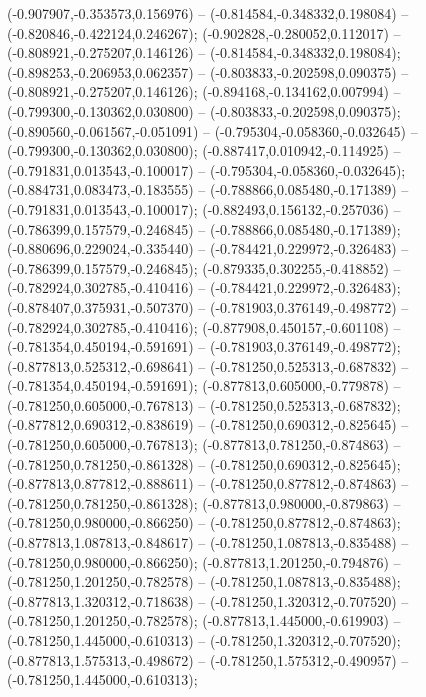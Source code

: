  (-0.907907,-0.353573,0.156976) -- (-0.814584,-0.348332,0.198084) -- (-0.820846,-0.422124,0.246267);
 (-0.902828,-0.280052,0.112017) -- (-0.808921,-0.275207,0.146126) -- (-0.814584,-0.348332,0.198084);
 (-0.898253,-0.206953,0.062357) -- (-0.803833,-0.202598,0.090375) -- (-0.808921,-0.275207,0.146126);
 (-0.894168,-0.134162,0.007994) -- (-0.799300,-0.130362,0.030800) -- (-0.803833,-0.202598,0.090375);
 (-0.890560,-0.061567,-0.051091) -- (-0.795304,-0.058360,-0.032645) -- (-0.799300,-0.130362,0.030800);
 (-0.887417,0.010942,-0.114925) -- (-0.791831,0.013543,-0.100017) -- (-0.795304,-0.058360,-0.032645);
 (-0.884731,0.083473,-0.183555) -- (-0.788866,0.085480,-0.171389) -- (-0.791831,0.013543,-0.100017);
 (-0.882493,0.156132,-0.257036) -- (-0.786399,0.157579,-0.246845) -- (-0.788866,0.085480,-0.171389);
 (-0.880696,0.229024,-0.335440) -- (-0.784421,0.229972,-0.326483) -- (-0.786399,0.157579,-0.246845);
 (-0.879335,0.302255,-0.418852) -- (-0.782924,0.302785,-0.410416) -- (-0.784421,0.229972,-0.326483);
 (-0.878407,0.375931,-0.507370) -- (-0.781903,0.376149,-0.498772) -- (-0.782924,0.302785,-0.410416);
 (-0.877908,0.450157,-0.601108) -- (-0.781354,0.450194,-0.591691) -- (-0.781903,0.376149,-0.498772);
 (-0.877813,0.525312,-0.698641) -- (-0.781250,0.525313,-0.687832) -- (-0.781354,0.450194,-0.591691);
 (-0.877813,0.605000,-0.779878) -- (-0.781250,0.605000,-0.767813) -- (-0.781250,0.525313,-0.687832);
 (-0.877812,0.690312,-0.838619) -- (-0.781250,0.690312,-0.825645) -- (-0.781250,0.605000,-0.767813);
 (-0.877813,0.781250,-0.874863) -- (-0.781250,0.781250,-0.861328) -- (-0.781250,0.690312,-0.825645);
 (-0.877813,0.877812,-0.888611) -- (-0.781250,0.877812,-0.874863) -- (-0.781250,0.781250,-0.861328);
 (-0.877813,0.980000,-0.879863) -- (-0.781250,0.980000,-0.866250) -- (-0.781250,0.877812,-0.874863);
 (-0.877813,1.087813,-0.848617) -- (-0.781250,1.087813,-0.835488) -- (-0.781250,0.980000,-0.866250);
 (-0.877813,1.201250,-0.794876) -- (-0.781250,1.201250,-0.782578) -- (-0.781250,1.087813,-0.835488);
 (-0.877813,1.320312,-0.718638) -- (-0.781250,1.320312,-0.707520) -- (-0.781250,1.201250,-0.782578);
 (-0.877813,1.445000,-0.619903) -- (-0.781250,1.445000,-0.610313) -- (-0.781250,1.320312,-0.707520);
 (-0.877813,1.575313,-0.498672) -- (-0.781250,1.575312,-0.490957) -- (-0.781250,1.445000,-0.610313);
